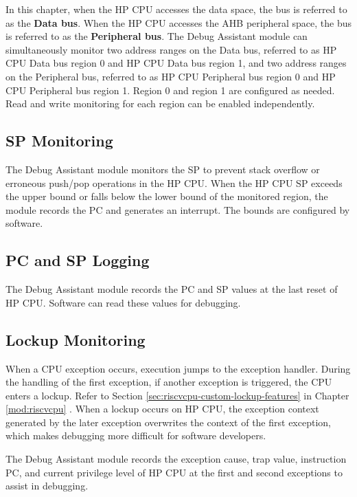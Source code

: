 \documentclass[main\_\_EN.tex]{subfiles}
\begin{document}
In this chapter, when the HP CPU accesses the data space, the bus is referred to as the \textbf{Data bus}. When the HP CPU accesses the AHB peripheral space, the bus is referred to as the \textbf{Peripheral bus}. The Debug Assistant module can simultaneously monitor two address ranges on the Data bus, referred to as HP CPU Data bus region 0 and HP CPU Data bus region 1, and two address ranges on the Peripheral bus, referred to as HP CPU Peripheral bus region 0 and HP CPU Peripheral bus region 1. Region 0 and region 1 are configured as needed. Read and write monitoring for each region can be enabled independently.

\subsection{SP Monitoring}

The Debug Assistant module monitors the SP to prevent stack overflow or erroneous push/pop operations in the HP CPU. When the HP CPU SP exceeds the upper bound or falls below the lower bound of the monitored region, the module records the PC and generates an interrupt. The bounds are configured by software.

\subsection{PC and SP Logging}

The Debug Assistant module records the PC and SP values at the last reset of HP CPU. Software can read these values for debugging.

\subsection{Lockup Monitoring}

When a CPU exception occurs, execution jumps to the exception handler. During the handling of the first exception, if another exception is triggered, the CPU enters a lockup. Refer to Section \ref{sec:riscvcpu-custom-lockup-features} \textit{} in Chapter \ref{mod:riscvcpu} \textit{}. When a lockup occurs on HP CPU, the exception context generated by the later exception overwrites the context of the first exception, which makes debugging more difficult for software developers.

The Debug Assistant module records the exception cause, trap value, instruction PC, and current privilege level of HP CPU at the first and second exceptions to assist in debugging.
\end{document}
